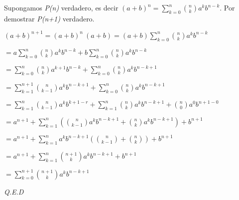 \documentclass{book}
\begin{document}
Supongamos \textit{P(n)} verdadero, es decir $(a+b)^n=\sum_{k=0}^n \binom{n}{k} a^kb^{n-k}$.
Por demostrar \textit{P(n+1)} verdadero.

$(a+b)^{n+1}=(a+b)^n \ (a+b)=(a+b) \sum_{k=0}^n \binom{n}{k} a^kb^{n-k}$

$=a\sum_{k=0}^n \binom{n}{k} a^kb^{n-k}+b\sum_{k=0}^n \binom{n}{k} a^kb^{n-k}$

$=\sum_{k=0}^n \binom{n}{k} a^{k+1}b^{n-k}+\sum_{k=0}^n \binom{n}{k} a^kb^{n-k+1}$

$=\sum_{k=1}^{n+1} \binom{n}{k-1} a^kb^{n-k+1}+\sum_{k=0}^n \binom{n}{k} a^kb^{n-k+1}$

$=\sum_{k=1}^n \binom{n}{k-1} a^kb^{k+1-r}+\sum_{k=1}^n \binom{n}{k} a^kb^{n-k+1}+\binom{n}{0}a^0b^{n+1-0}$

$=a^{n+1}+\sum_{k=1}^n(\binom{n}{k-1} a^kb^{n-k+1}+\binom{n}{k} a^kb^{n-k+1})+b^{n+1}$

$=a^{n+1}+\sum_{k=1}^n a^kb^{n-k+1}(\binom{n}{k-1}+\binom{n}{k})+b^{n+1}$

$=a^{n+1}+\sum_{k=1}^n \binom{n+1}{k}a^kb^{n-k+1}+b^{n+1}$

$=\sum_{k=0}^{n+1} \binom{n+1}{k}a^kb^{n-k+1}$

\textit{Q.E.D}
\end{document}
